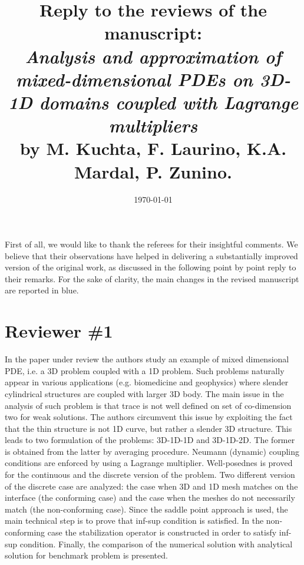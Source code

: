 \documentclass{article}
\title
{ Reply to the reviews of the manuscript:\\
\emph{Analysis and approximation of mixed-dimensional PDEs on 3D-1D domains coupled with Lagrange multipliers}\\
by M. Kuchta, F. Laurino, K.A. Mardal, P. Zunino.
}
\date{\today}
\begin{document}
\maketitle

First of all, we would like to thank the referees for their insightful comments. 
We believe that their observations have helped in delivering a substantially improved version of the original work,
as discussed in the following point by point reply to their remarks. 
For the sake of clarity, the main changes in the revised manuscript are reported in blue.

\vspace{1cm}

\section*{Reviewer \#1} 

In the paper under review the authors study an example of mixed dimensional PDE, i.e. a 3D problem coupled with a 1D problem. Such problems naturally appear in various applications (e.g. biomedicine and geophysics) where slender cylindrical structures are coupled with larger 3D body. The main issue in the analysis of such problem is that trace is not well defined on set of co-dimension two for weak solutions. The authors circumvent this issue by exploiting the fact that the thin structure is not 1D curve, but rather a slender 3D structure. This leads to two formulation of the problems: 3D-1D-1D and 3D-1D-2D. The former is obtained from the latter by averaging procedure. Neumann (dynamic) coupling conditions are enforced by using a Lagrange multiplier. Well-posednes is proved for the continuous and the discrete version of the problem. Two different version of the discrete case are analyzed: the case when 3D and 1D mesh matches on the interface (the conforming case) and the case when the meshes do not necessarily match (the non-conforming case). Since the saddle point approach is used, the main technical step is to prove that inf-sup condition is satisfied. In the non-conforming case the stabilization operator is constructed in order to satisfy inf-sup condition. Finally, the comparison of the numerical solution with analytical solution for benchmark problem is presented.
\end{document}
